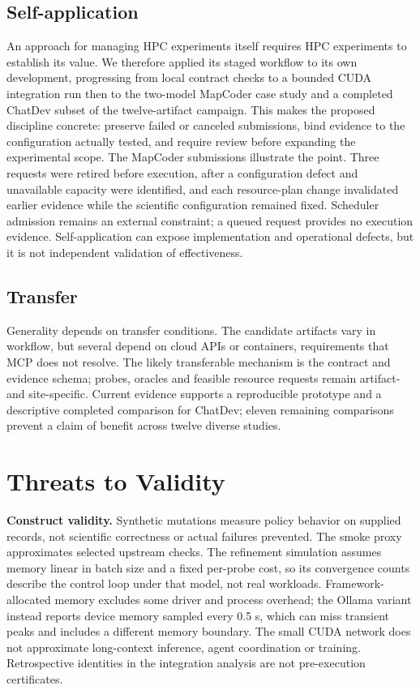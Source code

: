 \documentclass[pdflatex,sn-mathphys-num]{sn-jnl}
\theoremstyle{thmstylethree}
\begin{document}
\subsection{Self-application}
An approach for managing HPC experiments itself requires HPC experiments to establish its value. We therefore applied its staged workflow to its own development, progressing from local contract checks to a bounded CUDA integration run then to the two-model MapCoder case study and a completed ChatDev subset of the twelve-artifact campaign. This makes the proposed discipline concrete: preserve failed or canceled submissions, bind evidence to the configuration actually tested, and require review before expanding the experimental scope. The MapCoder submissions illustrate the point. Three requests were retired before execution, after a configuration defect and unavailable capacity were identified, and each resource-plan change invalidated earlier evidence while the scientific configuration remained fixed. Scheduler admission remains an external constraint; a queued request provides no execution evidence. Self-application can expose implementation and operational defects, but it is not independent validation of effectiveness.

\subsection{Transfer}
Generality depends on transfer conditions. The candidate artifacts vary in workflow, but several depend on cloud APIs or containers, requirements that MCP does not resolve. The likely transferable mechanism is the contract and evidence schema; probes, oracles and feasible resource requests remain artifact- and site-specific. Current evidence supports a reproducible prototype and a descriptive completed comparison for ChatDev; eleven remaining comparisons prevent a claim of benefit across twelve diverse studies.

\section{Threats to Validity}\label{sec:threats}
\textbf{Construct validity.} Synthetic mutations measure policy behavior on supplied records, not scientific correctness or actual failures prevented. The smoke proxy approximates selected upstream checks. The refinement simulation assumes memory linear in batch size and a fixed per-probe cost, so its convergence counts describe the control loop under that model, not real workloads. Framework-allocated memory excludes some driver and process overhead; the Ollama variant instead reports device memory sampled every 0.5 s, which can miss transient peaks and includes a different memory boundary. The small CUDA network does not approximate long-context inference, agent coordination or training. Retrospective identities in the integration analysis are not pre-execution certificates.
\end{document}
